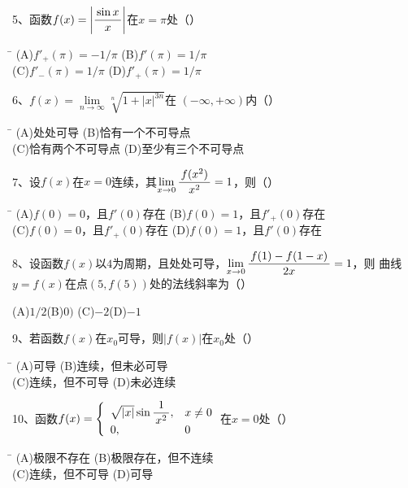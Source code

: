 \bigskip

5、函数$f(x)=\left|\displaystyle\frac{\,{\sin x}\,}{\,{x}\,}\right|$在$x=\pi$处（\quad）%
\begin{tabbing}
	\hspace{8cm}\=\kill
	\quad\quad\quad(A)\;$f'_+(\pi)=-1/\pi$ \> 
	(B)\;$f'(\pi)=1/\pi$ \\ 
	\quad\quad\quad(C)\;$f'_-(\pi)=1/\pi$\>
	(D)\;$f'_+(\pi)=1/\pi$
\end{tabbing}

\bigskip

6、$f(x)=\lim\limits_{n\to\infty}\sqrt[n]{1+|x|^{3n}}$在
$(-\infty,+\infty)$内（\quad）%
\begin{tabbing}
	\hspace{8cm}\=\kill
	\quad\quad\quad(A)\;处处可导 \> 
	(B)\;恰有一个不可导点 \\ 
	\quad\quad\quad(C)\;恰有两个不可导点\>
	(D)\;至少有三个不可导点
\end{tabbing}

\bigskip

7、设$f(x)$在$x=0$连续，其$\lim\limits_{x\to{0}}\displaystyle\frac{\,{f(x^2)}\,}{\,{x^2}\,}=1$，则（\quad）%
\begin{tabbing}
	\hspace{8cm}\=\kill
	\quad\quad\quad(A)\;$f(0)=0$，且$f'(0)$存在 \> 
	(B)\;$f(0)=1$，且$f'_+(0)$存在 \\ 
	\quad\quad\quad(C)\;$f(0)=0$，且$f'_+(0)$存在\>
	(D)\;$f(0)=1$，且$f'(0)$存在
\end{tabbing}

\bigskip

8、设函数$f(x)$以$4$为周期，且处处可导，$\lim\limits_{x\to{0}}\displaystyle\frac{\,{f(1)-f(1-x)}\,}{\,{2x}\,}=1$，则
曲线$y=f(x)$在点$(5,f(5))$处的法线斜率为（\quad）%

\quad (A)\;$1/2$\quad\quad\quad(B)\;$0)$
\quad\quad\quad (C)\;$-2$\quad\quad\quad(D)\;$-1$

\bigskip

9、若函数$f(x)$在$x_0$可导，则$|f(x)|$在$x_0$处（\quad）%
\begin{tabbing}
	\hspace{8cm}\=\kill
	\quad\quad\quad(A)\;可导 \> 
	(B)\;连续，但未必可导 \\ 
	\quad\quad\quad(C)\;连续，但不可导\>
	(D)\;未必连续
\end{tabbing}

\bigskip

10、函数$f(x)=\left\{\begin{array}{ll}
\sqrt{|x|}\sin\displaystyle\frac{\,{1}\,}{\,{x^2}\,},& x\ne 0\\
0,& 0
\end{array}\right.$在$x=0$处（\quad）%
\begin{tabbing}
	\hspace{8cm}\=\kill
	\quad\quad\quad(A)\;极限不存在 \> 
	(B)\;极限存在，但不连续 \\ 
	\quad\quad\quad(C)\;连续，但不可导\>
	(D)\;可导
\end{tabbing}

